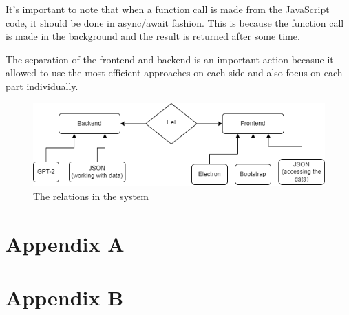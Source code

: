 \documentclass[12pt]{report}
\begin{document}
It's important to note that when a function call is made from the JavaScript code, it should be done in
async/await fashion. This is because the function call is made in the background and the result is returned
after some time.

The separation of the frontend and backend is an important action becasue it allowed to use the most efficient
approaches on each side and also focus on each part individually.

\begin{figure}[ht]
  \centering
  \includegraphics[width=1\linewidth]{img/system_diagram.png}
  \caption{The relations in the system}
  \label{fig:system_diagram}
\end{figure}








{}


\begin{appendices}
\section*{Appendix A}
\label{appendix:A}

\clearpage

\section*{Appendix B}
\label{appendix:B}

\end{appendices}

\end{document}
